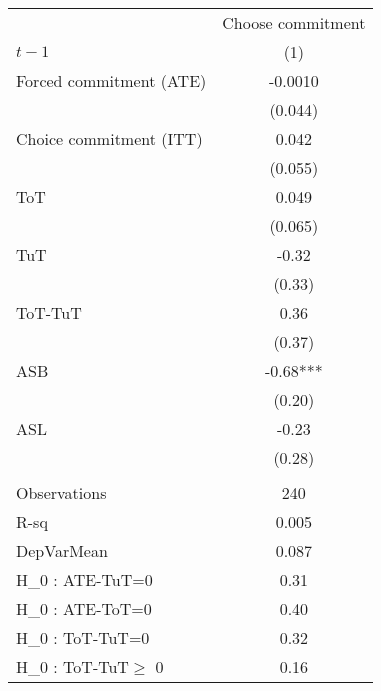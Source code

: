 \begin{tabular}{lc}
\toprule
      & Choose commitment \\
\cmidrule{2-2}$t-1$ & (1) \\
\midrule
\midrule
Forced commitment (ATE) & -0.0010 \\
      & (0.044) \\
Choice commitment (ITT) & 0.042 \\
      & (0.055) \\
ToT   & 0.049 \\
      & (0.065) \\
TuT   & -0.32 \\
      & (0.33) \\
\midrule
ToT-TuT & 0.36 \\
      & (0.37) \\
ASB   & -0.68*** \\
      & (0.20) \\
ASL   & -0.23 \\
      & (0.28) \\
      &  \\
\midrule
Observations & 240 \\
R-sq  & 0.005 \\
DepVarMean & 0.087 \\
H_0 : ATE-TuT=0 & 0.31 \\
H_0 : ATE-ToT=0 & 0.40 \\
H_0 : ToT-TuT=0 & 0.32 \\
H_0 : ToT-TuT$\geq$ 0 & 0.16 \\
\bottomrule
\bottomrule
\end{tabular}%
